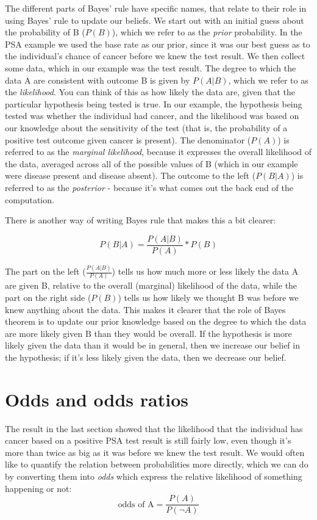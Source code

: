 \documentclass[12pt,]{book}
\theoremstyle{definition}
\theoremstyle{definition}
\theoremstyle{definition}
\theoremstyle{remark}
\begin{document}
The different parts of Bayes' rule have specific names, that relate to their role in using Bayes' rule to update our beliefs. We start out with an initial guess about the probability of B (\(P(B)\)), which we refer to as the \emph{prior} probability. In the PSA example we used the base rate as our prior, since it was our best guess as to the individual's chance of cancer before we knew the test result. We then collect some data, which in our example was the test result. The degree to which the data A are consistent with outcome B is given by \(P(A|B)\), which we refer to as the \emph{likelihood}. You can think of this as how likely the data are, given that the particular hypothesis being tested is true. In our example, the hypothesis being tested was whether the individual had cancer, and the likelihood was based on our knowledge about the sensitivity of the test (that is, the probability of a positive test outcome given cancer is present). The denominator (\(P(A)\)) is referred to as the \emph{marginal likelihood}, because it expresses the overall likelihood of the data, averaged across all of the possible values of B (which in our example were disease present and disease absent).
The outcome to the left (\(P(B|A)\)) is referred to as the \emph{posterior} - because it's what comes out the back end of the computation.

There is another way of writing Bayes rule that makes this a bit clearer:

\[
P(B|A) = \frac{P(A|B)}{P(A)}*P(B)
\]

The part on the left (\(\frac{P(A|B)}{P(A)}\)) tells us how much more or less likely the data A are given B, relative to the overall (marginal) likelihood of the data, while the part on the right side (\(P(B)\)) tells us how likely we thought B was before we knew anything about the data. This makes it clearer that the role of Bayes theorem is to update our prior knowledge based on the degree to which the data are more likely given B than they would be overall. If the hypothesis is more likely given the data than it would be in general, then we increase our belief in the hypothesis; if it's less likely given the data, then we decrease our belief.

\hypertarget{odds-and-odds-ratios}{%
\section{Odds and odds ratios}\label{odds-and-odds-ratios}}

The result in the last section showed that the likelihood that the individual has cancer based on a positive PSA test result is still fairly low, even though it's more than twice as big as it was before we knew the test result. We would often like to quantify the relation between probabilities more directly, which we can do by converting them into \emph{odds} which express the relative likelihood of something happening or not:\\
\[
\text{odds of A} = \frac{P(A)}{P(\neg A)}
\]
\end{document}
